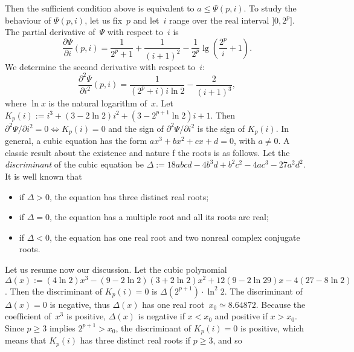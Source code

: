 Then the sufficient condition above is equivalent to \(a \leqslant
\Psi(p,i)\). To study the behaviour of \(\Psi(p,i)\), let us fix~\(p\)
and let~\(i\) range over the real interval \(]0,2^p]\). The partial
derivative of~\(\Psi\) with respect to~\(i\) is
\begin{equation*}
\frac{\partial\Psi}{\partial i}(p,i) = \frac{1}{2^p+1}
+ \frac{1}{(i+1)^2} - \frac{1}{2^p}\lg\left(\frac{2^p}{i}+1\right).
\end{equation*}
We determine the second derivative with respect to~\(i\):
\begin{equation*}
\frac{\partial^2\Psi}{\partial i^2}(p,i) = \frac{1}{(2^p+i)i\ln 2} - \frac{2}{(i+1)^3},
\end{equation*}
where \(\ln x\) is the natural logarithm of~\(x\). Let \(K_p(i) := i^3
+ (3 - 2\ln 2)i^2 + (3 - 2^{p+1}\ln 2)i + 1\).  Then
\(\partial^2\Psi/\partial i^2 = 0 \Leftrightarrow K_p(i) = 0\) and the
sign of \(\partial^2\Psi/\partial i^2\) is the sign of \(K_p(i)\). In
general, a cubic equation has the form \(ax^3 + bx^2 + cx + d = 0\),
with \(a \neq 0\). A classic result about the existence and nature f
the roots is as follows. Let the \emph{discriminant} of the cubic
equation be \(\Delta := 18abcd - 4b^3d + b^2c^2 - 4ac^3 -
27a^2d^2\). It is well known that
\begin{itemize}

  \item if \(\Delta > 0\), the equation has three distinct real roots;

  \item if \(\Delta = 0\), the equation has a multiple root and all
    its roots are real;

  \item if \(\Delta < 0\), the equation has one real root and two
    nonreal complex conjugate roots.

\end{itemize}
Let us resume now our discussion. Let the cubic polynomial \(\Delta(x)
:= (4\ln 2)x^3 - (9 - 2\ln 2)(3 + 2\ln 2)x^2 + 12(9 - 2\ln 29)x - 4(27
- 8\ln 2)\). Then the discriminant of \(K_p(i) = 0\) is
\(\Delta(2^{p+1}) \cdot \ln^2 2\). The discriminant of \(\Delta(x) = 0
\) is negative, thus \(\Delta(x)\) has one real root~\(x_0 \simeq
8.64872\). Because the coefficient of~\(x^3\) is positive,
\(\Delta(x)\) is negative if \(x < x_0\) and positive if \(x >
x_0\). Since \(p \geqslant 3\) implies \(2^{p+1} > x_0\), the
discriminant of \(K_p(i) = 0\) is positive, which means that
\(K_p(i)\) has three distinct real roots if \(p \geqslant 3\), and so

